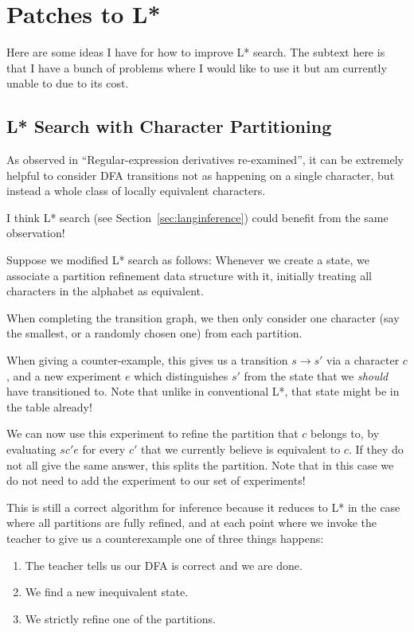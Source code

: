 \documentclass[a4paper]{book}
\begin{document}
\chapter{Patches to L*}

Here are some ideas I have for how to improve L* search.
The subtext here is that I have a bunch of problems where I would like to use it but am currently unable to due to its cost.

\section{L* Search with Character Partitioning}\label{sec:lstarcharpartition}

As observed in ``Regular-expression derivatives re-examined''\cite{DBLP:journals/jfp/OwensRT09},
it can be extremely helpful to consider DFA transitions not as happening on a single character,
but instead a whole class of locally equivalent characters.

I think L* search (see Section~\ref{sec:langinference}) could benefit from the same observation!

Suppose we modified L* search as follows:
Whenever we create a state,
we associate a partition refinement data structure with it,
initially treating all characters in the alphabet as equivalent.

When completing the transition graph,
we then only consider one character (say the smallest, or a randomly chosen one) from each partition.

When giving a counter-example,
this gives us a transition \(s \to s'\) via a character \(c\),
and a new experiment \(e\) which distinguishes \(s'\) from the state that we \emph{should} have transitioned to.
Note that unlike in conventional L*,
that state might be in the table already!

We can now use this experiment to refine the partition that \(c\) belongs to,
by evaluating \(sc'e\) for every \(c'\) that we currently believe is equivalent to \(c\).
If they do not all give the same answer,
this splits the partition.
Note that in this case we do not need to add the experiment to our set of experiments!

This is still a correct algorithm for inference because it reduces to L* in the case where all partitions are fully refined,
and at each point where we invoke the teacher to give us a counterexample one of three things happens:

\begin{enumerate}
\item The teacher tells us our DFA is correct and we are done.
\item We find a new inequivalent state.
\item We strictly refine one of the partitions.
\end{enumerate}
\end{document}
